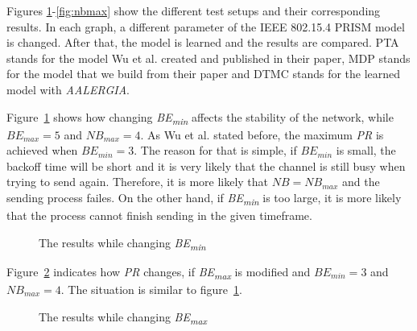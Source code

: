 \documentclass[
a4paper,
12pt
]{scrartcl}
\begin{document}
Figures \ref{fig:bemin}-\ref{fig:nbmax} show the different test setups and their corresponding results. In each graph, a different parameter of the IEEE 802.15.4 PRISM model is changed. After that, the model is learned and the results are compared. PTA stands for the model Wu et al. created and published in their paper, MDP stands for the model that we build from their paper and DTMC stands for the learned model with \emph{AALERGIA}.

Figure~\ref{fig:bemin} shows how changing \textit{BE\textsubscript{min}} affects the stability of the network, while $BE_{max}=5$ and $NB_{max}=4$. As Wu et al. stated before, the maximum \textit{PR} is achieved when $BE_{min}=3$. The reason for that is simple, if $BE_{min}$ is small, the backoff time will be short and it is very likely that the channel is still busy when trying to send again. Therefore, it is more likely that $NB=NB_{max}$ and the sending process failes. On the other hand, if \textit{BE\textsubscript{min}} is too large, it is more likely that the process cannot finish sending in the given timeframe.

\begin{figure}[H]
\centering
 \caption{The results while changing \textit{BE\textsubscript{min}}}
  \label{fig:bemin}
\end{figure}

Figure~\ref{fig:bemax} indicates how \textit{PR} changes, if \textit{BE\textsubscript{max}} is modified and $BE_{min}=3$ and $NB_{max}=4$. The situation is similar to figure~\ref{fig:bemin}.

\begin{figure}[H]
\centering
 \caption{The results while changing \textit{BE\textsubscript{max}}}
    \label{fig:bemax}
\end{figure}
\end{document}
